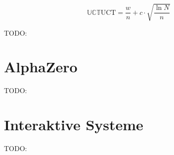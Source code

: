 \begin{equation}
    \mathbb{U}\mathbb{C}\mathbb{T}  \text{UCT} = \frac{w}{n} + c \cdot \sqrt{\frac{\ln N}{n}}
\end{equation}

TODO:

\section{AlphaZero}
\label{chapter:alphazero}

TODO:

\section{Interaktive Systeme}
\label{chapter:interaktive-systeme}

TODO:

